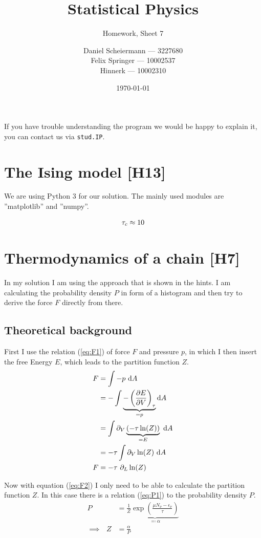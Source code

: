 \documentclass[a4paper,12pt]{scrartcl}
\title{Statistical Physics}
\subtitle{Homework, Sheet 7}
\author{Daniel Scheiermann --- 3227680 \\ Felix Springer --- 10002537 \\ Hinnerk --- 10002310}
\date{\today}
\begin{document}
\maketitle

If you have trouble understanding the program we would be happy to explain it, you can contact us via \texttt{stud.IP}.

\section{The Ising model [H13]}
We are using Python 3 for our solution. The mainly used modules are ''matplotlib'' and ''numpy''.

\begin{align}
	\tau_c \approx 10 \notag
\end{align}

\section{Thermodynamics of a chain [H7]}
In my solution I am using the approach that is shown in the hints.
I am calculating the probability density $P$ in form of a histogram and then try to derive the force $F$ directly from there.

\subsection{Theoretical background}
First I use the relation (\ref{eq:F1}) of force $F$ and pressure $p$, in which I then insert the free Energy $E$, which leads to the partition function $Z$.
\begin{align}
	F &= \int - p \text{ d}A \label{eq:F1} \\
	&= - \int \underbrace{- \left( \frac{\partial E}{\partial V} \right)_{\tau}}_{= p} \text{d}A \notag \\
	&= \int \partial_V \underbrace{(- \tau \ln(Z))}_{= E} \text{ d}A \notag \\
	&= - \tau \int \partial_V \ln(Z) \text{ d}A \notag \\
	F &= - \tau \text{ } \partial_L \ln(Z) \label{eq:F2}
\end{align}

Now with equation (\ref{eq:F2}) I only need to be able to calculate the partition function $Z$.
In this case there is a relation (\ref{eq:P1}) to the probability density $P$.
\begin{align}
	P &= \frac{1}{Z} \underbrace{\exp \left( {\frac{\mu N_\nu - \epsilon_\nu}{\tau}} \right)}_{\eqqcolon \alpha} \label{eq:P1} \\
	\implies \text{ } Z &= \frac{\alpha}{P} \label{eq:Z1}
\end{align}
\end{document}
